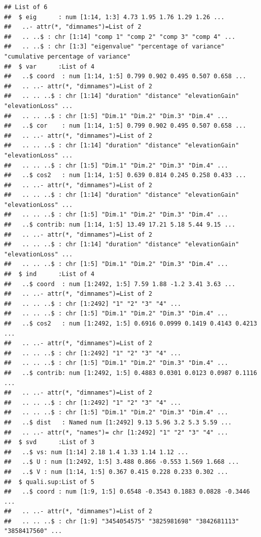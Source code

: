 \documentclass[
]{book}
\begin{document}
\begin{verbatim}
## List of 6
##  $ eig      : num [1:14, 1:3] 4.73 1.95 1.76 1.29 1.26 ...
##   ..- attr(*, "dimnames")=List of 2
##   .. ..$ : chr [1:14] "comp 1" "comp 2" "comp 3" "comp 4" ...
##   .. ..$ : chr [1:3] "eigenvalue" "percentage of variance" "cumulative percentage of variance"
##  $ var      :List of 4
##   ..$ coord  : num [1:14, 1:5] 0.799 0.902 0.495 0.507 0.658 ...
##   .. ..- attr(*, "dimnames")=List of 2
##   .. .. ..$ : chr [1:14] "duration" "distance" "elevationGain" "elevationLoss" ...
##   .. .. ..$ : chr [1:5] "Dim.1" "Dim.2" "Dim.3" "Dim.4" ...
##   ..$ cor    : num [1:14, 1:5] 0.799 0.902 0.495 0.507 0.658 ...
##   .. ..- attr(*, "dimnames")=List of 2
##   .. .. ..$ : chr [1:14] "duration" "distance" "elevationGain" "elevationLoss" ...
##   .. .. ..$ : chr [1:5] "Dim.1" "Dim.2" "Dim.3" "Dim.4" ...
##   ..$ cos2   : num [1:14, 1:5] 0.639 0.814 0.245 0.258 0.433 ...
##   .. ..- attr(*, "dimnames")=List of 2
##   .. .. ..$ : chr [1:14] "duration" "distance" "elevationGain" "elevationLoss" ...
##   .. .. ..$ : chr [1:5] "Dim.1" "Dim.2" "Dim.3" "Dim.4" ...
##   ..$ contrib: num [1:14, 1:5] 13.49 17.21 5.18 5.44 9.15 ...
##   .. ..- attr(*, "dimnames")=List of 2
##   .. .. ..$ : chr [1:14] "duration" "distance" "elevationGain" "elevationLoss" ...
##   .. .. ..$ : chr [1:5] "Dim.1" "Dim.2" "Dim.3" "Dim.4" ...
##  $ ind      :List of 4
##   ..$ coord  : num [1:2492, 1:5] 7.59 1.88 -1.2 3.41 3.63 ...
##   .. ..- attr(*, "dimnames")=List of 2
##   .. .. ..$ : chr [1:2492] "1" "2" "3" "4" ...
##   .. .. ..$ : chr [1:5] "Dim.1" "Dim.2" "Dim.3" "Dim.4" ...
##   ..$ cos2   : num [1:2492, 1:5] 0.6916 0.0999 0.1419 0.4143 0.4213 ...
##   .. ..- attr(*, "dimnames")=List of 2
##   .. .. ..$ : chr [1:2492] "1" "2" "3" "4" ...
##   .. .. ..$ : chr [1:5] "Dim.1" "Dim.2" "Dim.3" "Dim.4" ...
##   ..$ contrib: num [1:2492, 1:5] 0.4883 0.0301 0.0123 0.0987 0.1116 ...
##   .. ..- attr(*, "dimnames")=List of 2
##   .. .. ..$ : chr [1:2492] "1" "2" "3" "4" ...
##   .. .. ..$ : chr [1:5] "Dim.1" "Dim.2" "Dim.3" "Dim.4" ...
##   ..$ dist   : Named num [1:2492] 9.13 5.96 3.2 5.3 5.59 ...
##   .. ..- attr(*, "names")= chr [1:2492] "1" "2" "3" "4" ...
##  $ svd      :List of 3
##   ..$ vs: num [1:14] 2.18 1.4 1.33 1.14 1.12 ...
##   ..$ U : num [1:2492, 1:5] 3.488 0.866 -0.553 1.569 1.668 ...
##   ..$ V : num [1:14, 1:5] 0.367 0.415 0.228 0.233 0.302 ...
##  $ quali.sup:List of 5
##   ..$ coord : num [1:9, 1:5] 0.6548 -0.3543 0.1883 0.0828 -0.3446 ...
##   .. ..- attr(*, "dimnames")=List of 2
##   .. .. ..$ : chr [1:9] "3454054575" "3825981698" "3842681113" "3858417560" ...

\end{verbatim}
\end{document}
